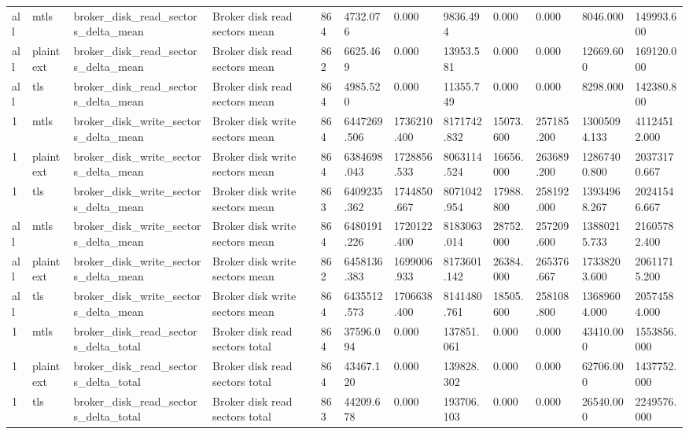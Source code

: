 \begin{longtable}{llllllllllll}
all & mtls & broker\_disk\_read\_sectors\_delta\_mean & Broker disk read sectors mean & 864 & 4732.076 & 0.000 & 9836.494 & 0.000 & 0.000 & 8046.000 & 149993.600 \\
all & plaintext & broker\_disk\_read\_sectors\_delta\_mean & Broker disk read sectors mean & 862 & 6625.469 & 0.000 & 13953.581 & 0.000 & 0.000 & 12669.600 & 169120.000 \\
all & tls & broker\_disk\_read\_sectors\_delta\_mean & Broker disk read sectors mean & 864 & 4985.520 & 0.000 & 11355.749 & 0.000 & 0.000 & 8298.000 & 142380.800 \\
1 & mtls & broker\_disk\_write\_sectors\_delta\_mean & Broker disk write sectors mean & 864 & 6447269.506 & 1736210.400 & 8171742.832 & 15073.600 & 257185.200 & 13005094.133 & 41124512.000 \\
1 & plaintext & broker\_disk\_write\_sectors\_delta\_mean & Broker disk write sectors mean & 864 & 6384698.043 & 1728856.533 & 8063114.524 & 16656.000 & 263689.200 & 12867400.800 & 20373170.667 \\
1 & tls & broker\_disk\_write\_sectors\_delta\_mean & Broker disk write sectors mean & 863 & 6409235.362 & 1744850.667 & 8071042.954 & 17988.800 & 258192.000 & 13934968.267 & 20241546.667 \\
all & mtls & broker\_disk\_write\_sectors\_delta\_mean & Broker disk write sectors mean & 864 & 6480191.226 & 1720122.400 & 8183063.014 & 28752.000 & 257209.600 & 13880215.733 & 21605782.400 \\
all & plaintext & broker\_disk\_write\_sectors\_delta\_mean & Broker disk write sectors mean & 862 & 6458136.383 & 1699006.933 & 8173601.142 & 26384.000 & 265376.667 & 17338203.600 & 20611715.200 \\
all & tls & broker\_disk\_write\_sectors\_delta\_mean & Broker disk write sectors mean & 864 & 6435512.573 & 1706638.400 & 8141480.761 & 18505.600 & 258108.800 & 13689604.000 & 20574584.000 \\
1 & mtls & broker\_disk\_read\_sectors\_delta\_total & Broker disk read sectors total & 864 & 37596.094 & 0.000 & 137851.061 & 0.000 & 0.000 & 43410.000 & 1553856.000 \\
1 & plaintext & broker\_disk\_read\_sectors\_delta\_total & Broker disk read sectors total & 864 & 43467.120 & 0.000 & 139828.302 & 0.000 & 0.000 & 62706.000 & 1437752.000 \\
1 & tls & broker\_disk\_read\_sectors\_delta\_total & Broker disk read sectors total & 863 & 44209.678 & 0.000 & 193706.103 & 0.000 & 0.000 & 26540.000 & 2249576.000 \\

\end{longtable}
